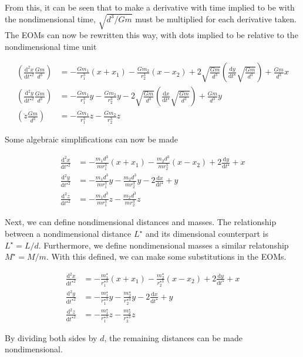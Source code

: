 \documentclass{article}
\newcommand{\dd}[2]{\frac{\mathrm{d}#1}{\mathrm{d}#2}}
\begin{document}
From this, it can be seen that to make a derivative with time implied to be with the nondimensional time, $\sqrt{d^3/Gm}$ must be multiplied for each derivative taken. The EOMs can now be rewritten this way, with dots implied to be relative to the nondimensional time unit

\[\begin{aligned}
    \left(\dd{^2x}{t^{\star2}}\frac{Gm}{d^3}\right)&=-\frac{Gm_1}{r_1^3}(x+x_1)-\frac{Gm_2}{r_2^3}(x-x_2)+2\sqrt{\frac{Gm}{d^3}}\left(\dd{y}{t^\star}\sqrt{\frac{Gm}{d^3}}\right)+\frac{Gm}{d^3}x\\
    \left(\dd{^2y}{t^{\star2}}\frac{Gm}{d^3}\right)&=-\frac{Gm_1}{r_1^3}y-\frac{Gm_2}{r_2^3}y-2\sqrt{\frac{Gm}{d^3}}\left(\dd{x}{t^\star}\sqrt{\frac{Gm}{d^3}}\right)+\frac{Gm}{d^3}y\\
    \left(\ddot{z}\frac{Gm}{d^3}\right)&=-\frac{Gm_1}{r_1^3}z-\frac{Gm_2}{r_2^3}z
\end{aligned}\]

Some algebraic simplifications can now be made

\[\begin{aligned}
    \dd{^2x}{t^{\star2}}&=-\frac{m_1 d^3}{m r_1^3}(x+x_1)-\frac{m_2 d^3}{m r_2^3}(x-x_2)+2\dd{y}{t^\star}+x\\
    \dd{^2y}{t^{\star2}}&=-\frac{m_1 d^3}{m r_1^3}y-\frac{m_2 d^3}{m r_2^3}y-2\dd{x}{t^\star}+y\\
    \dd{^2z}{t^{\star2}}&=-\frac{m_1 d^3}{m r_1^3}z-\frac{m_2 d^3}{m r_2^3}z
\end{aligned}\]

Next, we can define nondimensional distances and masses. The relationship between a nondimensional distance $L^\star$ and its dimensional counterpart is $L^\star=L/d$. Furthermore, we define nondimensional masses a similar relatonship $M^\star=M/m$. With this defined, we can make some substitutions in the EOMs.

\[\begin{aligned}
    \dd{^2x}{t^{\star2}}&=-\frac{m_1^\star}{r_1^{\star3}}(x+x_1)-\frac{m_2^\star}{r_2^{\star3}}(x-x_2)+2\dd{y}{t^\star}+x\\
    \dd{^2y}{t^{\star2}}&=-\frac{m_1^\star}{r_1^{\star3}}y-\frac{m_2^\star}{r_2^{\star3}}y-2\dd{x}{t^\star}+y\\
    \dd{^2z}{t^{\star2}}&=-\frac{m_1^\star}{r_1^{\star3}}z-\frac{m_2^\star}{r_2^{\star3}}z
\end{aligned}\]

By dividing both sides by $d$, the remaining distances can be made nondimensional.
\end{document}

